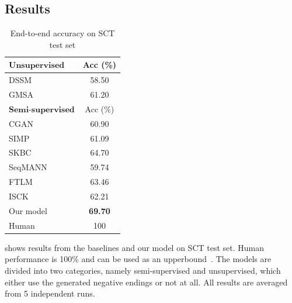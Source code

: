 \subsection{Results}
\label{sec:result}

\begin{table}[th]
 \small
\centering
\begin{tabular}{lc}
\hline
$\textbf{Unsupervised}$ & Acc (\%)\\
\hline
DSSM& 58.50\\
GMSA& 61.20\\
\hline
$\textbf{Semi-supervised}$ & Acc (\%)\\
\hline
CGAN& 60.90 \\
SIMP&61.09\\
SKBC&64.70\\
SeqMANN& 59.74\\
FTLM& 63.46 \\
ISCK& 62.21 \\
Our model& {\bf 69.70}\\
\hline
Human& 100\\
\hline
\end{tabular}
\caption{End-to-end accuracy on SCT test set}
\label{tab:all-models}
\end{table}

 shows results from the baselines and our model on 
SCT test set. 
Human performance is 100\% and can be used as an 
upperbound~\cite{mostafazadeh2016corpus}. The models are divided into two
categories, namely semi-supervised and unsupervised, which either use
the generated negative endings or not at all. All results are averaged from
5 independent runs.

